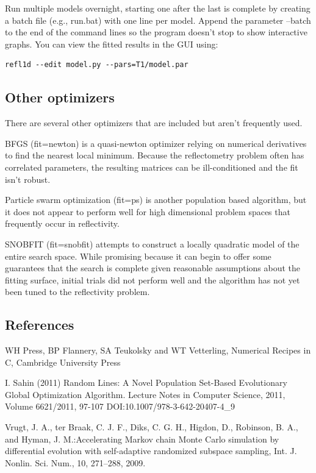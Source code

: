 \documentclass[letterpaper,10pt,english]{sphinxmanual}
\begin{document}
Run multiple models overnight, starting one after the last is complete
by creating a batch file (e.g., run.bat) with one line per model.  Append
the parameter --batch to the end of the command lines so the program
doesn't stop to show interactive graphs.  You can view the fitted
results in the GUI using:

\begin{Verbatim}[commandchars=@\[\]]
refl1d --edit model.py --pars=T1/model.par
\end{Verbatim}


\subsection{Other optimizers}
\label{guide/fitting:other-optimizers}
There are several other optimizers that are included but aren't frequently used.

BFGS (fit=newton) is a quasi-newton optimizer relying on numerical derivatives
to find the nearest local minimum.  Because the reflectometry problem
often has correlated parameters, the resulting matrices can be ill-conditioned
and the fit isn't robust.

Particle swarm optimization (fit=ps) is another population based algorithm,
but it does not appear to perform well for high dimensional problem spaces
that frequently occur in reflectivity.

SNOBFIT (fit=snobfit) attempts to construct a locally quadratic model of
the entire search space.  While promising because it can begin to offer
some guarantees that the search is complete given reasonable assumptions
about the fitting surface, initial trials did not perform well and the
algorithm has not yet been tuned to the reflectivity problem.


\subsection{References}
\label{guide/fitting:references}
WH Press, BP Flannery, SA Teukolsky and WT Vetterling, Numerical Recipes in C, Cambridge University Press

I. Sahin (2011) Random Lines: A Novel Population Set-Based Evolutionary Global Optimization Algorithm. Lecture Notes in Computer Science, 2011, Volume 6621/2011, 97-107
DOI:10.1007/978-3-642-20407-4\_9

Vrugt, J. A., ter Braak, C. J. F., Diks, C. G. H., Higdon, D., Robinson, B. A., and Hyman, J. M.:Accelerating Markov chain Monte Carlo simulation by differential evolution with self-adaptive randomized subspace sampling, Int. J. Nonlin. Sci. Num., 10, 271–288, 2009.
\end{document}
